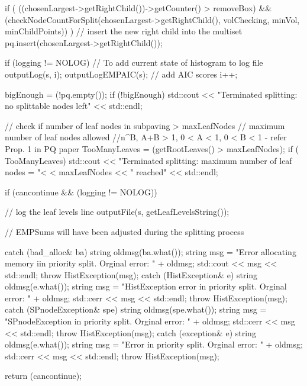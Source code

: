 \begin{DoxyCode}
{{{            if ( ((chosenLargest->getRightChild())->getCounter() > removeBox) 
            && (checkNodeCountForSplit(chosenLargest->getRightChild(),
                    volChecking, minVol, minChildPoints)) ) {
                // insert the new right child into the multiset
                pq.insert(chosenLargest->getRightChild());
            }

            if (logging != NOLOG) {
                // To add current state of histogram to log file
                outputLog(s, i);
                outputLogEMPAIC(s); // add AIC scores
                i++;
            }

            bigEnough = (!pq.empty());
            if (!bigEnough)
                std::cout << "Terminated splitting: no splittable nodes left"
                    << std::endl;
        
        
        // check if number of leaf nodes in subpaving > maxLeafNodes
        // maximum number of leaf nodes allowed
        //n^B, A+B > 1, 0  < A < 1, 0 < B < 1 - refer Prop. 1 in PQ paper
        TooManyLeaves = (getRootLeaves() > maxLeafNodes);
        if ( TooManyLeaves) {
          std::cout << "Terminated splitting: maximum number of leaf nodes = "<
      < maxLeafNodes << " reached"
                          << std::endl;
        }
      
  }
         
         
        if (cancontinue && (logging != NOLOG)) {
            // log the leaf levels line
            outputFile(s, getLeafLevelsString());

        }

        // EMPSums will have been adjusted during the splitting process
   }

    catch (bad_alloc& ba) {
        string oldmsg(ba.what());
        string msg = "Error allocating memory iin priority split.  Orginal
       error: "
                                    + oldmsg;
        std::cout << msg << std::endl;
        throw HistException(msg);
    }
    catch (HistException& e) {
        string oldmsg(e.what());
        string msg = "HistException error in priority split.  Orginal error: "
                                    + oldmsg;
        std::cerr << msg << std::endl;
        throw HistException(msg);
    }
    catch (SPnodeException& spe) {
        string oldmsg(spe.what());
        string msg = "SPnodeException in priority split.  Orginal error: "
                                    + oldmsg;
        std::cerr << msg << std::endl;
        throw HistException(msg);
    }
    catch (exception& e) {
        string oldmsg(e.what());
        string msg = "Error in priority split.  Orginal error: " + oldmsg;
        std::cerr << msg << std::endl;
        throw HistException(msg);
    }

    return (cancontinue);
}
\end{DoxyCode}
